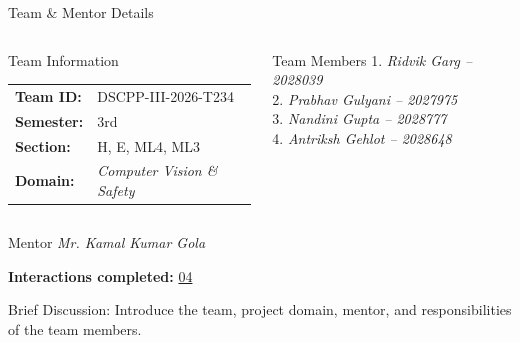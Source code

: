 \documentclass[aspectratio=169,11pt]{beamer}
\newcommand{\smallnote}[1]{%
\vspace{0.08cm}
{\scriptsize\color{GEUGrey}#1}
}
\newcommand{\placeholder}[1]{%
\textit{\color{GEUGrey}#1}
}
\begin{document}
\begin{frame}{Team \& Mentor Details}

\begin{columns}[T,totalwidth=\textwidth]


\begin{block}{Team Information}
\begin{tabular}{@{}ll@{}}
\textbf{Team ID:} & DSCPP-III-2026-T234\\
\textbf{Semester:} & 3rd\\
\textbf{Section:} & H, E, ML4, ML3\\
\textbf{Domain:} & \placeholder{Computer Vision \& Safety}
\end{tabular}
\end{block}


\begin{block}{Team Members}
1.\quad \placeholder{Ridvik Garg -- 2028039}\\
2.\quad \placeholder{Prabhav Gulyani -- 2027975}\\
3.\quad \placeholder{Nandini Gupta -- 2028777}\\
4.\quad \placeholder{Antriksh Gehlot -- 2028648}
\end{block}

\end{columns}

\vspace{2mm}

\begin{block}{Mentor}
\placeholder{Mr. Kamal Kumar Gola}
\hfill
\textbf{Interactions completed:}
\underline{\hspace{4mm}04\hspace{4mm}}
\end{block}

\vfill

\smallnote{
Brief Discussion: Introduce the team, project domain, mentor,
and responsibilities of the team members.
}

\end{frame}
\end{document}

